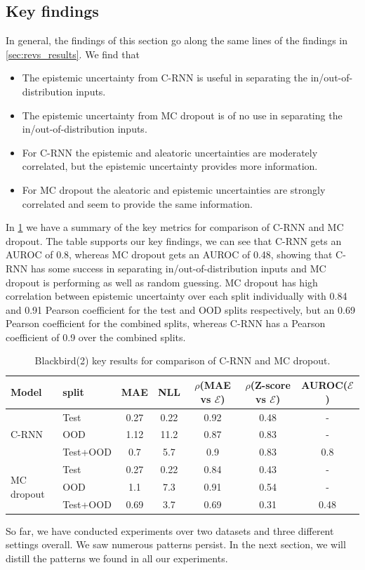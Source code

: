 \clearpage
\subsection{Key findings}

In general, the findings of this section go along the same lines of the findings in \cref{sec:revs_results}. We find that 

\begin{itemize}
    \item The epistemic uncertainty from C-RNN is useful in separating the in/out-of-distribution inputs.
    \item The epistemic uncertainty from MC dropout is of no use in separating the in/out-of-distribution inputs.
    \item For C-RNN the epistemic and aleatoric uncertainties are moderately correlated, but the epistemic uncertainty provides more information. 
    \item For MC dropout the aleatoric and epistemic uncertainties are strongly correlated and seem to provide the same information. 
\end{itemize}{}


In \cref{tbl:bb2_comparison} we have a summary of the key metrics for comparison of C-RNN and MC dropout. The table supports our key findings, we can see that C-RNN gets an AUROC of 0.8, whereas MC dropout gets an AUROC of 0.48, showing that C-RNN has some success in separating in/out-of-distribution inputs and MC dropout is performing as well as random guessing. MC dropout has high correlation between epistemic uncertainty over each split individually with 0.84 and 0.91 Pearson coefficient for the test and OOD splits respectively, but an 0.69 Pearson coefficient for the combined splits, whereas C-RNN has a Pearson coefficient of 0.9 over the combined splits.  

\begin{table}[h]
\centering
    \begin{tabular}{l l c c c c c}  
        \toprule
        Model & split & MAE & NLL & $\rho$(MAE vs $\mathcal{E}$) &
        $\rho$(Z-score vs $\mathcal{E}$) & AUROC($\mathcal{E}$)\\
        \midrule
        \multirow{3}{*}{C-RNN} 
            & Test     & 0.27 & 0.22 & 0.92 & 0.48 & - \\  
            & OOD      & 1.12 & 11.2 & 0.87 & 0.83 & -\\  
            & Test+OOD & 0.7  & 5.7  & 0.9  & 0.83 & 0.8\\ 

        \midrule
        \multirow{3}{*}{MC dropout} 
            & Test     & 0.27 & 0.22 & 0.84  & 0.43 & - \\  
            & OOD      & 1.1 & 7.3   & 0.91  & 0.54 & -\\  
            & Test+OOD & 0.69 & 3.7  & 0.69  & 0.31 & 0.48\\ 

        \toprule
    \end{tabular}
    \caption{Blackbird(2) key results for comparison of C-RNN and MC dropout.}
    \label{tbl:bb2_comparison}
\end{table}

So far, we have conducted experiments over two datasets and three different settings overall. We saw numerous patterns persist. In the next section, we will distill the patterns we found in all our experiments.

